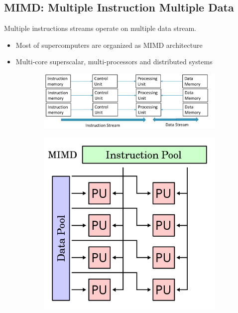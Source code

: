 \subsection{MIMD: Multiple Instruction Multiple Data}

Multiple instructions streams operate on multiple data stream.
\begin{itemize}
    \item Most of supercomputers are organized as MIMD architecture
    \item Multi-core superscalar, multi-processors and distributed systems
\end{itemize}

\begin{figure}[ht]
\centering
\begin{subfigure}{.7\textwidth}
  \centering
  \includegraphics[width=.9\textwidth]{figure_parallel/mimd.png}
\end{subfigure}%
\begin{subfigure}{.3\textwidth}
  \centering
  \includegraphics[width=.9\textwidth]{figure_parallel/mimd2.png}
\end{subfigure}
\end{figure}

